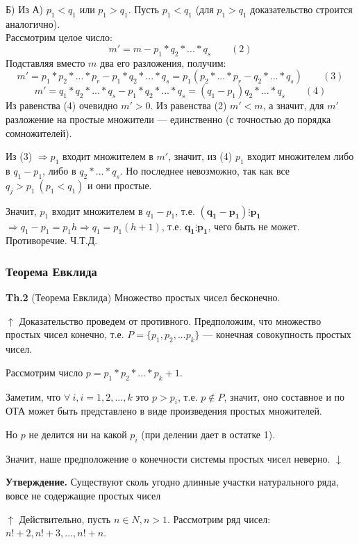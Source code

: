 \documentclass{article}
\begin{document}
  Б) Из А) \( p_1 < q_1 \) или \( p_1 > q_1 \). Пусть \( p_1 < q_1 \) (для \( p_1 > q_1 \) доказательство строится аналогично).\\
  Рассмотрим целое число: \[ m' = m - p_1*q_2*...*q_s\qquad (2) \]
  Подставляя вместо \( m \) два его разложения, получим: \[ m' = p_1*p_2*...*p_r - p_1*q_2*...*q_s = p_1(p_2*...*p_r - q_2*...*q_s)\qquad (3) \] \[ m' = q_1*q_2*...*q_s - p_1*q_2*...*q_s = (q_1 - p_1)q_2*...*q_s\qquad (4) \]
  Из равенства (4) очевидно \( m' > 0 \). Из равенства (2) \( m' < m \), а значит, для \( m' \) разложение на простые множители --- единственно (с точностью до порядка сомножителей).

  Из (3) \( \Rightarrow p_1 \) входит множителем в \( m' \), значит, из (4) \( p_1 \) входит множителем либо в \( q_1 - p_1 \), либо в \( q_2*...*q_s \). Но последнее невозможно, так как все \( q_j > p_1\ (p_1 < q_1) \) и они простые.
  
  Значит, \( p_1 \) входит множителем в \( q_1 - p_1 \), т.е. \( \mathbf{(q_1 - p_1) \vdots p_1} \) \( \Rightarrow q_1 - p_1 = p_1h \Rightarrow q_1 = p_1(h + 1) \), т.е. \( \mathbf{q_1 \vdots p_1} \), чего быть не может. Противоречие. Ч.Т.Д.

  \subsubsection{Теорема Евклида}
  \textbf{Th.2} (Теорема Евклида) Множество простых чисел бесконечно.

  \( \uparrow \) Доказательство проведем от противного. Предположим, что множество простых чисел конечно, т.е. \( P=\{p_1,p_2,...p_k\} \) --- конечная совокупность простых чисел.

  Рассмотрим число \( p = p_1*p_2*...*p_k + 1 \).

  Заметим, что \( \forall\ i, i=1,2,...,k \) это \( p > p_i \), т.е. \( p \notin P \), значит, оно составное и по ОТА может быть представлено в виде произведения простых множителей.

  Но \( p \) не делится ни на какой \( p_i \) (при делении дает в остатке 1).

  Значит, наше предположение о конечности системы простых чисел неверно. \( \downarrow \)

  \textbf{Утверждение.} Существуют сколь угодно длинные участки натурального ряда, вовсе не содержащие простых чисел

  \( \uparrow \) Действительно, пусть \( n \in N, n > 1 \). Рассмотрим ряд чисел: \( n! + 2,n! + 3,...,n! + n \).
  
\end{document}
